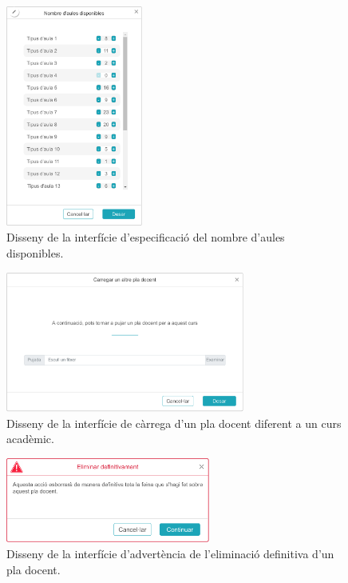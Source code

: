 \documentclass[a4paper,12pt]{ThesisStyle}
\begin{document}
\begin{figure}[H]
	\centering
	\includegraphics[width=0.4\textwidth]{assets/interfaces/administradors/plansDocents/aulesDialog.pdf}
	\caption{\label{img:plansDocents_aulesDialog}Disseny de la interfície d'especificació del nombre d'aules disponibles.}
\end{figure}

\begin{figure}[H]
	\centering
	\includegraphics[width=0.7\textwidth]{assets/interfaces/administradors/plansDocents/carregarDialog.pdf}
	\caption{\label{img:plansDocents_carregarDialog}Disseny de la interfície de càrrega d'un pla docent diferent a un curs acadèmic.}
\end{figure}

\begin{figure}[H]
	\centering
	\includegraphics[width=0.6\textwidth]{assets/interfaces/administradors/plansDocents/esborrarBox.pdf}
	\caption{\label{img:plansDocents_esborrarBox}Disseny de la interfície d'advertència de l'eliminació definitiva d'un pla docent.}
\end{figure}
\end{document}
